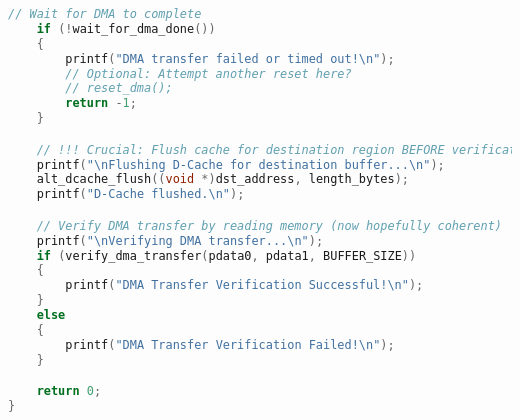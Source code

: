\begin{lstlisting}[language=C, caption={hello\_world.c - Nios V DMA Test Application}, label=lst:c_helloworld]
    // Wait for DMA to complete
    if (!wait_for_dma_done())
    {
        printf("DMA transfer failed or timed out!\n");
        // Optional: Attempt another reset here?
        // reset_dma();
        return -1;
    }

    // !!! Crucial: Flush cache for destination region BEFORE verification !!!
    printf("\nFlushing D-Cache for destination buffer...\n");
    alt_dcache_flush((void *)dst_address, length_bytes);
    printf("D-Cache flushed.\n");

    // Verify DMA transfer by reading memory (now hopefully coherent)
    printf("\nVerifying DMA transfer...\n");
    if (verify_dma_transfer(pdata0, pdata1, BUFFER_SIZE))
    {
        printf("DMA Transfer Verification Successful!\n");
    }
    else
    {
        printf("DMA Transfer Verification Failed!\n");
    }

    return 0;
}
\end{lstlisting}
